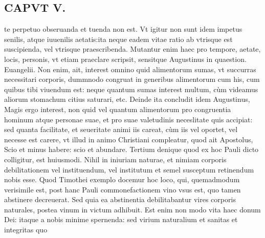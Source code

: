 \documentclass{article}
\begin{document}
\begin{pages}
\section*{CAPVT V. }
\marginpar{[ p.381 ]}\pstart te perpetuo obseruanda et tuenda non est. Vt igitur non sunt idem impetus senilis, atque iuuenilis aetatis:ita neque eadem vitae ratio ab vtrisque est suscipienda, vel vtrisque praescribenda. Mutantur enim haec pro tempore, aetate, locis, personis, vt etiam praeclare scripsit, sensitque Augustinus in quaestion. Euangelii. Non enim, ait, interest omnino quid alimentorum sumas, vt succurras necessitari corporis, dummnodo congruat in generibus alimentorum cum his, cum quibus tibi viuendum est: neque quantum sumas interest multum, cùm videamus aliorum stomachum citius saturari, etc. Deinde ita concludit idem Augustinus, Magis ergo interest, non quid vel quantum alimentorum pro congruentia hominum atque personae suae, et pro suae valetudinis neceslitate quis accipiat: sed quanta facilitate, et seueritate animi iis careat, cùm iis vel oportet, vel necesse est carere, vt illud in animo Christiani compleatur, quod ait Apostolus, Scio et minus habere: scio et abundare. Tertium denique quod ex hoc Pauli dicto colligitur, est huiusmodi. Nihil in iniuriam naturae, et nimiam corporis debilitationem vel instituendum, vel institutum et semel susceptum retinendum nobis esse. Quod Timothei exemplo docemur hoc loco, qui, quemadmodum verisimile est, post hanc Pauli commonefactionem vino vsus est, quo tamen abstinere decreuerat. Sed quia ea abstinentia debilitabantur vires corporis naturales, postea vinum in victum adhibuit. Est enim non modo vita haec donum Dei: itaque a nobis minime spernenda: sed virium naturalium et sanitas et integritas quo\pend

\end{pages}
\end{document}
